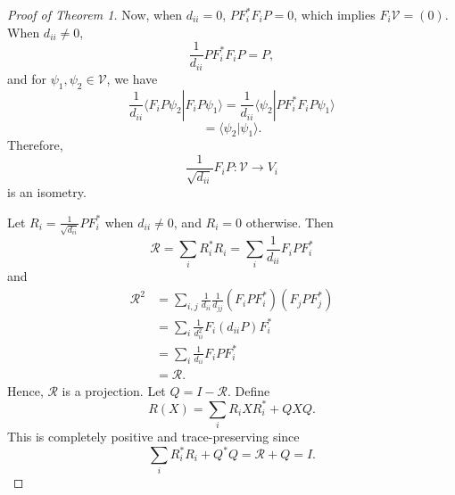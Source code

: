 \documentclass[12pt]{article}
\theoremstyle{definition}
\begin{document}
\begin{proof}[Proof of Theorem 1]
Now, when $d_{ii}=0$, $PF_i^*F_iP=0$, which implies $F_i\mathcal{V}=(0)$. When $d_{ii} \neq 0$,
\[
\frac{1}{d_{ii}}PF_i^*F_iP = P,
\]
and for $\psi_1,\psi_2 \in \mathcal{V}$, we have
\[
\frac{1}{d_{ii}}\langle F_iP\psi_2|F_iP\psi_1\rangle = \frac{1}{d_{ii}}\langle \psi_2|PF_i^*F_iP\psi_1\rangle
\]
\[
= \langle \psi_2|\psi_1\rangle.
\]
Therefore,
\[
\frac{1}{\sqrt{d_{ii}}}F_iP : \mathcal{V} \to V_i
\]
is an isometry.

Let $R_i=\frac{1}{\sqrt{d_{ii}}}PF_i^*$ when $d_{ii} \neq 0$, and $R_i=0$ otherwise. Then
\[
\mathcal{R}=\sum_i R_i^*R_i = \sum_i \frac{1}{d_{ii}}F_iPF_i^*
\]
and
\begin{align*}
\mathcal{R}^2 &= \sum_{i,j} \frac{1}{d_{ii}}\frac{1}{d_{jj}}(F_iPF_i^*)(F_jPF_j^*) \\
&= \sum_i \frac{1}{d_{ii}^2}F_i(d_{ii}P)F_i^* \\
&= \sum_i \frac{1}{d_{ii}}F_iPF_i^* \\
&= \mathcal{R}.
\end{align*}
Hence, $\mathcal{R}$ is a projection. Let $Q=I-\mathcal{R}$. Define
\[
R(X)=\sum_i R_iXR_i^* + QXQ.
\]
This is completely positive and trace-preserving since
\[
\sum_i R_i^*R_i + Q^*Q = \mathcal{R}+Q = I.
\]
\end{proof}
\end{document}

